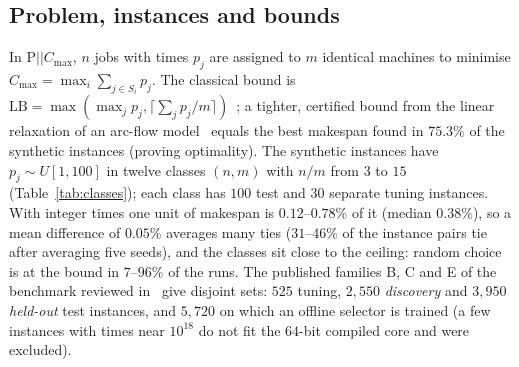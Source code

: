 \documentclass[conference,a4paper]{IEEEtran}
\newcommand{\Cmax}{C_{\max}}
\begin{document}
\subsection{Problem, instances and bounds}
In P$||\Cmax$, $n$ jobs with times $p_j$ are assigned to $m$ identical machines to minimise $\Cmax=\max_i\sum_{j\in S_i}p_j$.
The classical bound is $\mathrm{LB}=\max(\max_jp_j,\lceil\sum_jp_j/m\rceil)$~\cite{Graham1969}; a tighter, certified bound from the linear relaxation of an arc-flow model~\cite{MradSouayah2018} equals the best makespan found in $75.3\%$ of the synthetic instances (proving optimality).
The synthetic instances have $p_j\sim U[1,100]$ in twelve classes $(n,m)$ with $n/m$ from $3$ to $15$ (Table~\ref{tab:classes}); each class has $100$ test and $30$ separate tuning instances.
With integer times one unit of makespan is $0.12$--$0.78\%$ of it (median $0.38\%$), so a mean difference of $0.05\%$ averages many ties ($31$--$46\%$ of the instance pairs tie after averaging five seeds), and the classes sit close to the ceiling: random choice is at the bound in $7$--$96\%$ of the runs.
The published families B, C and E of the benchmark reviewed in~\cite{OstojicEtAl2025} give disjoint sets: $525$ tuning, $2{,}550$ \emph{discovery} and $3{,}950$ \emph{held-out} test instances, and $5{,}720$ on which an offline selector is trained (a few instances with times near $10^{18}$ do not fit the $64$-bit compiled core and were excluded).


\end{document}
